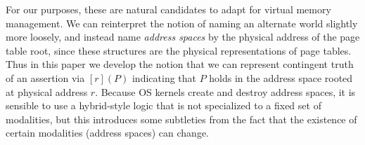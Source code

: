 For our purposes, these are natural candidates to adapt for virtual memory management. We can reinterpret the notion of 
naming an alternate world slightly more loosely, and instead name \emph{address spaces} by the physical address of the 
page table root, since these structures are the physical representations of page tables. Thus in this paper we develop 
the notion that we can represent contingent truth of an assertion via $[r](P)$ indicating that $P$ holds in the address 
space rooted at physical address $r$. Because OS kernels create and destroy address spaces, it is sensible to use
a hybrid-style logic that is not specialized to a fixed set of modalities, but this introduces
some subtleties from the fact that the existence of certain modalities (address spaces) can change.


